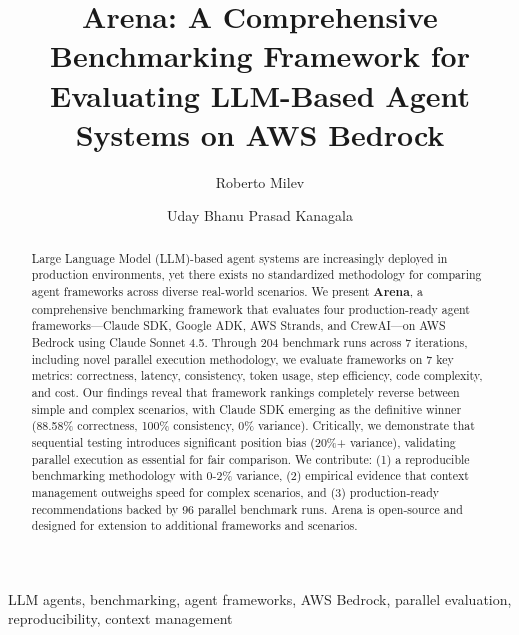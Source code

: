 \documentclass[sigconf,nonacm]{acmart}
\begin{document}
\title{Arena: A Comprehensive Benchmarking Framework for Evaluating LLM-Based Agent Systems on AWS Bedrock}

\author{Roberto Milev}

\author{Uday Bhanu Prasad Kanagala}

\begin{abstract}
Large Language Model (LLM)-based agent systems are increasingly deployed in production environments, yet there exists no standardized methodology for comparing agent frameworks across diverse real-world scenarios. We present \textbf{Arena}, a comprehensive benchmarking framework that evaluates four production-ready agent frameworks—Claude SDK, Google ADK, AWS Strands, and CrewAI—on AWS Bedrock using Claude Sonnet 4.5. Through 204 benchmark runs across 7 iterations, including novel parallel execution methodology, we evaluate frameworks on 7 key metrics: correctness, latency, consistency, token usage, step efficiency, code complexity, and cost. Our findings reveal that framework rankings completely reverse between simple and complex scenarios, with Claude SDK emerging as the definitive winner (88.58\% correctness, 100\% consistency, 0\% variance). Critically, we demonstrate that sequential testing introduces significant position bias (20\%+ variance), validating parallel execution as essential for fair comparison. We contribute: (1) a reproducible benchmarking methodology with 0-2\% variance, (2) empirical evidence that context management outweighs speed for complex scenarios, and (3) production-ready recommendations backed by 96 parallel benchmark runs. Arena is open-source and designed for extension to additional frameworks and scenarios.
\end{abstract}

\begin{keywords}
LLM agents, benchmarking, agent frameworks, AWS Bedrock, parallel evaluation, reproducibility, context management
\end{keywords}
\end{document}
